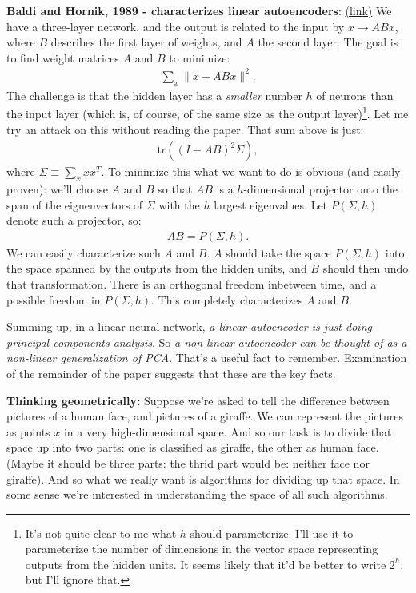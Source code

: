\documentclass[12pt]{article}
\newcommand{\link}[2]{\href{#1}{#2}}
\begin{document}
\textbf{Baldi and Hornik, 1989 - characterizes linear autoencoders}:
\link{http://scholar.google.ca/scholar?cluster=11637720331851320383&hl=en&as_sdt=0,5}{(link)}
We have a three-layer network, and the output is related to the input
by $x \rightarrow ABx$, where $B$ describes the first layer of
weights, and $A$ the second layer.  The goal is to find weight
matrices $A$ and $B$ to minimize:
\begin{eqnarray}
\sum_x \|x-ABx\|^2.
\end{eqnarray}
The challenge is that the hidden layer has a \emph{smaller} number $h$
of neurons than the input layer (which is, of course, of the same size
as the output layer)\footnote{It's not quite clear to me what $h$
  should parameterize.  I'll use it to parameterize the number of
  dimensions in the vector space representing outputs from the hidden
  units.  It seems likely that it'd be better to write $2^h$, but I'll
  ignore that.}.  Let me try an attack on this without reading the
paper.  That sum above is just:
\begin{eqnarray}
\mbox{tr}((I-AB)^2 \Sigma),
\end{eqnarray}
where $\Sigma \equiv \sum_x x x^T$.  To minimize this what we want to
do is obvious (and easily proven): we'll choose $A$ and $B$ so that
$AB$ is a $h$-dimensional projector onto the span of the eignenvectors
of $\Sigma$ with the $h$ largest eigenvalues.  Let $P(\Sigma, h)$
denote such a projector, so:
\begin{eqnarray}
AB = P(\Sigma, h).
\end{eqnarray}
We can easily characterize such $A$ and $B$.  $A$ should take the
space $P(\Sigma, h)$ into the space spanned by the outputs from the
hidden units, and $B$ should then undo that transformation.  There is
an orthogonal freedom inbetween time, and a possible freedom in
$P(\Sigma, h)$.  This completely characterizes $A$ and $B$.

Summing up, in a linear neural network, \emph{a linear autoencoder is
  just doing principal components analysis}.  So \emph{a non-linear
  autoencoder can be thought of as a non-linear generalization of
  PCA}.  That's a useful fact to remember.  Examination of the
remainder of the paper suggests that these are the key facts.

\textbf{Thinking geometrically:} Suppose we're asked to tell the
difference between pictures of a human face, and pictures of a
giraffe.  We can represent the pictures as points $x$ in a very
high-dimensional space.  And so our task is to divide that space up
into two parts: one is classified as giraffe, the other as human face.
(Maybe it should be three parts: the thrid part would be: neither face
nor giraffe).  And so what we really want is algorithms for dividing
up that space.  In some sense we're interested in understanding the
space of all such algorithms. 
\end{document}
